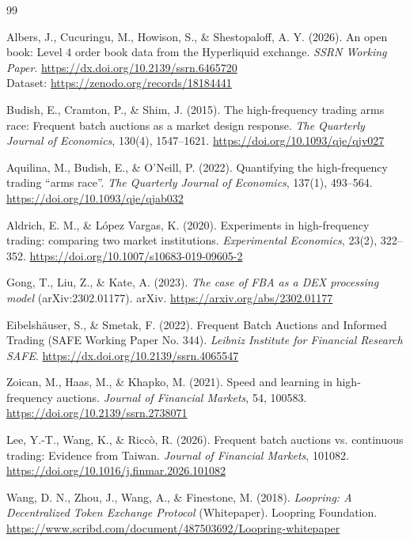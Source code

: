 \documentclass[11pt]{article}
\begin{document}
\begin{thebibliography}{99}

Albers, J., Cucuringu, M., Howison, S., \& Shestopaloff, A. Y. (2026).
An open book: Level 4 order book data from the Hyperliquid exchange.
\textit{SSRN Working Paper}.
\url{https://dx.doi.org/10.2139/ssrn.6465720} \\
Dataset: \url{https://zenodo.org/records/18184441}

Budish, E., Cramton, P., \& Shim, J. (2015).
The high-frequency trading arms race: Frequent batch auctions as a market design response.
\textit{The Quarterly Journal of Economics}, 130(4), 1547--1621.
\url{https://doi.org/10.1093/qje/qjv027}

Aquilina, M., Budish, E., \& O'Neill, P. (2022).
Quantifying the high-frequency trading ``arms race''.
\textit{The Quarterly Journal of Economics}, 137(1), 493--564.
\url{https://doi.org/10.1093/qje/qjab032}

Aldrich, E. M., \& L{\'o}pez Vargas, K. (2020).
Experiments in high-frequency trading: comparing two market institutions.
\textit{Experimental Economics}, 23(2), 322--352.
\url{https://doi.org/10.1007/s10683-019-09605-2}

Gong, T., Liu, Z., \& Kate, A. (2023).
\textit{The case of FBA as a DEX processing model} (arXiv:2302.01177).
arXiv. \url{https://arxiv.org/abs/2302.01177}

Eibelsh{\"a}user, S., \& Smetak, F. (2022).
Frequent Batch Auctions and Informed Trading (SAFE Working Paper No. 344).
\textit{Leibniz Institute for Financial Research SAFE}.
\url{https://dx.doi.org/10.2139/ssrn.4065547}

Zoican, M., Haas, M., \& Khapko, M. (2021).
Speed and learning in high-frequency auctions.
\textit{Journal of Financial Markets}, 54, 100583.
\url{https://doi.org/10.2139/ssrn.2738071}

Lee, Y.-T., Wang, K., \& Ricc{\`o}, R. (2026).
Frequent batch auctions vs. continuous trading: Evidence from Taiwan.
\textit{Journal of Financial Markets}, 101082.
\url{https://doi.org/10.1016/j.finmar.2026.101082}

Wang, D. N., Zhou, J., Wang, A., \& Finestone, M. (2018).
\textit{Loopring: A Decentralized Token Exchange Protocol} (Whitepaper).
Loopring Foundation.
\url{https://www.scribd.com/document/487503692/Loopring-whitepaper}


\end{thebibliography}
\end{document}
